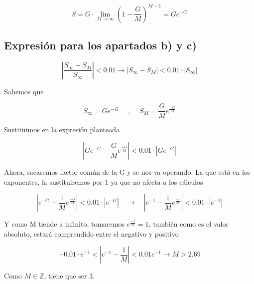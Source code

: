 \documentclass{article}
\begin{document}
$$S = G \cdot \lim_{M \to \infty}(1 - \frac{G}{M})^{M-1} = Ge^{-G}$$

\subsection{Expresión para los apartados b) y c) }

$$\left| \frac{S_{\infty} - S_M}{S_{\infty}} \right| < 0.01 \rightarrow \left| S_{\infty} - S_M \right| < 0.01 \cdot \left| S_{\infty}\right|$$

Sabemos que 

$$ S_{\infty} = Ge^{-G} \quad \text{ , } \quad S_M = \frac{G}{M}e^{\frac{-G}{M}} $$

Sustituimos en la expresión planteada

$$\left| Ge^{-G} - \frac{G}{M}e^{\frac{-G}{M}} \right| < 0.01 \cdot \left| Ge^{-G}\right|$$

Ahora, sacaremos factor común de la G y se nos va operando. La que está en los exponentes, la sustituiremos por 1 ya que no afecta a los cálculos

$$\left| e^{-G} - \frac{1}{M}e^{\frac{-G}{M}} \right| < 0.01 \cdot \left| e^{-G}\right| \quad \rightarrow \quad \left| e^{-1} - \frac{1}{M}e^{\frac{-1}{M}} \right| < 0.01 \cdot \left| e^{-1}\right| $$

Y como M tiende a infinito, tomaremos $e^{\frac{-1}{M}} = 1$, también como es el valor absoluto, estará comprendido entre el negativo y positivo

$$-0.01 \cdot  e^{-1} <\left| e^{-1} - \frac{1}{M} \right| < 0.01  e^{-1} \rightarrow  M > 2.69$$

Como $M \in \mathbb{Z}$, tiene que ser 3.
\end{document}
